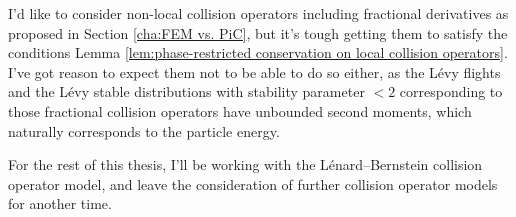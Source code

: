     \begin{remark}
        I'd like to consider non-local collision operators including fractional derivatives as proposed in Section \ref{cha:FEM vs. PiC}, but it's tough getting them to satisfy the conditions Lemma \ref{lem:phase-restricted conservation on local collision operators}. I've got reason to expect them not to be able to do so either, as the Lévy flights and the Lévy stable distributions with stability parameter $< 2$ corresponding to those fractional collision operators have unbounded second moments, which naturally corresponds to the particle energy.

        For the rest of this thesis, I'll be working with the Lénard--Bernstein collision operator model, and leave the consideration of further collision operator models for another time.
    \end{remark}
    